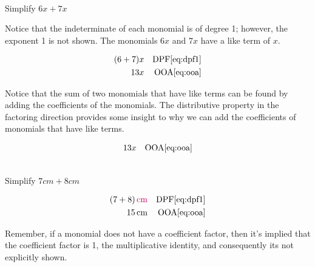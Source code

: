 \begin{example}[id:20141120-203846] \label{20141120-203846} \hfill \\

Simplify $6x+7x$

\soln

\solnsteps

Notice that the indeterminate of each monomial is of degree 1; however, the exponent 1 is not shown.  The monomials $6x$ and $7x$ have a like term of $x$.

\begin{align*}
(6+7)x && \text{DPF} \eqref{eq:dpf1} \\
13x && \text{OOA} \eqref{eq:ooa} 
\end{align*}

Notice that the sum of two monomials that have like terms can be found by adding the coefficients of the monomials.  The distributive property in the factoring direction provides some insight to why we can add the coefficients of monomials that have like terms.\\

\soln

\lesssteps
\begin{align*}
13x && \text{OOA} \eqref{eq:ooa} 
\end{align*}

\end{example}



\begin{example}[id:20141027-075159]\label{20141027-075159} \hfill \\

Simplify $7\unit{cm}+8\unit{cm}$

\soln

\solnsteps
\begin{align*}
(7+8)\alert{\unit{cm}}  &&\text{DPF}\eqref{eq:dpf1} \\
15\unit{cm}  &&\text{OOA} \eqref{eq:ooa}
\end{align*}
\end{example}

\begin{remark}
Remember, if a monomial does not have a coefficient factor, then it's implied that the coefficient factor is 1, the multiplicative identity, and consequently its not explicitly shown.
\end{remark}

